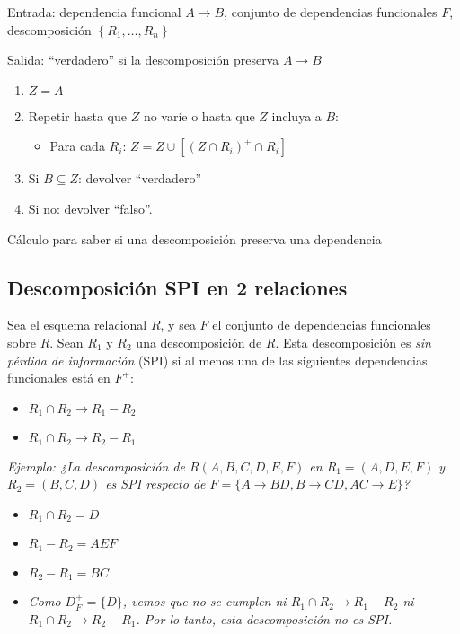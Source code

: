 \documentclass[a4paper, twoside]{article}
\begin{document}
\begin{algorithm}[H]
	Entrada: dependencia funcional $A\to B$, conjunto de dependencias funcionales $F$, descomposición $\left\{ R_{1},\ldots,R_{n}\right\}$

	Salida: ``verdadero'' si la descomposición preserva $A\to B$
	\begin{enumerate}
		\item $Z=A$
		\item Repetir hasta que $Z$ no varíe o hasta que $Z$ incluya a $B$:
		\begin{itemize}
			\item Para cada $R_{i}$: $Z=Z\cup\left[\left(Z\cap R_{i}\right)^{+}\cap R_{i}\right]$
		\end{itemize}
		\item Si $B\subseteq Z$: devolver ``verdadero''
		\item Si no: devolver ``falso''.
	\end{enumerate}
	\caption{Cálculo para saber si una descomposición preserva una dependencia}
\end{algorithm}

\subsection{Descomposición SPI en 2 relaciones}
Sea el esquema relacional $R$, y sea $F$ el conjunto de dependencias funcionales sobre $R$. Sean $R_{1}$ y $R_{2}$ una descomposición de $R$. Esta descomposición es \emph{sin pérdida de información} (SPI) si al menos una de las siguientes dependencias funcionales está en $F^{+}$:
\begin{itemize}
	\item $R_{1}\cap R_{2}\to R_{1}-R_{2}$
	\item $R_{1}\cap R_{2}\to R_{2}-R_{1}$
\end{itemize}

\emph{Ejemplo: ¿La descomposición de $R(A,B,C,D,E,F)$ en $R_{1}=(A,D,E,F)$ y $R_{2}=(B,C,D)$ es SPI respecto de $F=\{A\to BD,B\to CD,AC\to E\}$?}
\begin{itemize}
	\item $R_{1}\cap R_{2}=D$
	\item $R_{1}-R_{2}=AEF$
	\item $R_{2}-R_{1}=BC$
	\item \emph{Como $D_{F}^{+}=\{D\}$, vemos que no se cumplen ni $R_{1}\cap R_{2}\to R_{1}-R_{2}$ ni $R_{1}\cap R_{2}\to R_{2}-R_{1}$. Por lo tanto, esta descomposición no es SPI.}
\end{itemize}
\end{document}
